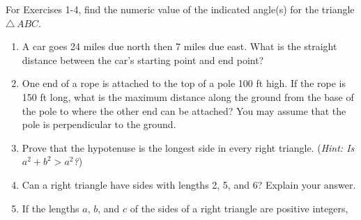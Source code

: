 \startexercises\label{sec1dot1}
\vspace{5mm}
{\small
\par\noindent For Exercises 1-4, find the numeric value of the indicated angle(s) for the
triangle $\triangle\,ABC$.
\begin{enumerate}[\bfseries 1.]
 For Exercises 5-8, find the numeric value of the indicated angle(s) for the right
 triangle $\triangle\,ABC$, with $C$ being the right angle.
 [{[\bfseries 1.]}]
 \item A car goes 24 miles due north then 7 miles due east. What is the straight distance between
 the car's starting point and end point?
 \item One end of a rope is attached to the top of a pole 100 ft high.
 If the rope is 150 ft long, what is the maximum distance along the
 ground from the base of the pole to where the other end can be attached? You may assume
 that the pole is perpendicular to the ground.
 \item\label{exer:hypo} Prove that the hypotenuse is the longest side in every right triangle.
 (\emph{Hint: Is $a^2 + b^2 > a^2$?})
 \item Can a right triangle have sides with lengths 2, 5, and 6? Explain your answer. 
 \item If the lengths $a$, $b$, and $c$ of the sides of a right triangle are positive integers,

\end{enumerate}}
